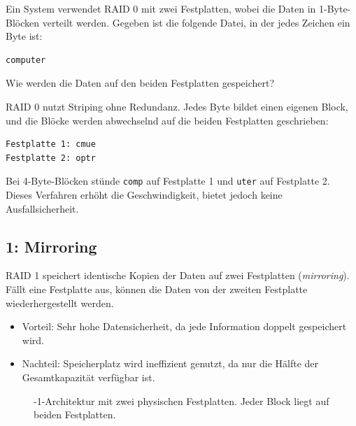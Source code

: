\begin{myexercise}
    Ein System verwendet \gls{RAID} 0 mit zwei Festplatten, wobei die Daten in 1-Byte-Blöcken verteilt werden. Gegeben ist die folgende Datei, in der jedes Zeichen ein Byte ist:

    \begin{verbatim}
computer
\end{verbatim}

    Wie werden die Daten auf den beiden Festplatten gespeichert?

    \begin{myanswer}
        \gls{RAID} 0 nutzt Striping ohne Redundanz. Jedes Byte bildet einen eigenen Block, und die Blöcke werden abwechselnd auf die beiden Festplatten geschrieben:

        \begin{verbatim}
Festplatte 1: cmue
Festplatte 2: optr
\end{verbatim}

        Bei 4-Byte-Blöcken stünde \texttt{comp} auf Festplatte 1 und \texttt{uter} auf Festplatte 2. Dieses Verfahren erhöht die Geschwindigkeit, bietet jedoch keine Ausfallsicherheit.
    \end{myanswer}
\end{myexercise}

\subsection{ 1: Mirroring}
\gls{RAID} 1 speichert identische Kopien der Daten auf zwei Festplatten (\textit{mirroring}). Fällt eine Festplatte aus, können die Daten von der zweiten Festplatte wiederhergestellt werden.

\begin{itemize}
    \item Vorteil: Sehr hohe Datensicherheit, da jede Information doppelt gespeichert wird.
    \item Nachteil: Speicherplatz wird ineffizient genutzt, da nur die Hälfte der Gesamtkapazität verfügbar ist.
\end{itemize}

\begin{figure}[H]
    \centering

    \caption[-1-Architektur mit zwei physischen Festplatten]{-1-Architektur mit zwei physischen Festplatten. Jeder Block liegt auf beiden Festplatten.}
    \label{fig:raid1}
\end{figure}

